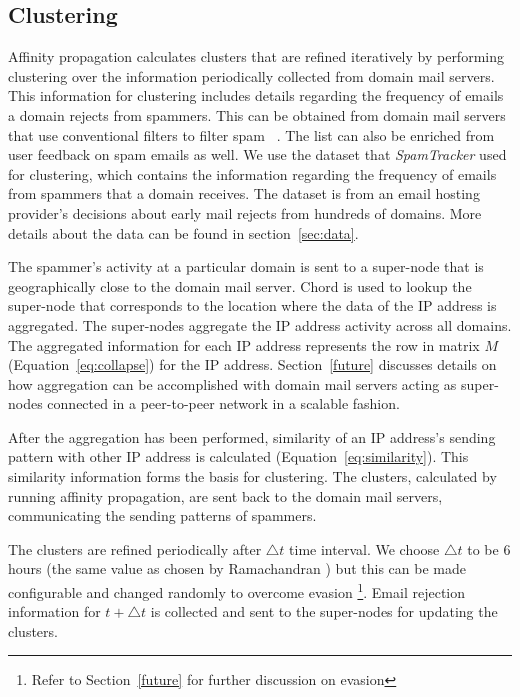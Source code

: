 \subsection{Clustering}
\label{arch-cluster}

Affinity propagation calculates clusters that are refined iteratively by performing clustering over the information periodically collected from domain mail servers. This information for clustering includes details regarding the frequency of emails a domain rejects from spammers. This can be obtained from domain mail servers that use conventional filters to filter spam~\cite{spamassassin} . The list can also be enriched from user feedback on spam emails as well. We use the dataset that \emph{SpamTracker} \cite{bb} used for clustering, which contains the information regarding the frequency of emails from spammers that a domain receives. The dataset is from an email hosting provider's decisions about early mail rejects from hundreds of domains. More details about the data can be found in section~\ref{sec:data}. 

The spammer's activity at a particular domain is sent to a super-node that is geographically close to the domain mail server. Chord is used to lookup the super-node that corresponds to the location where the data of the IP address is aggregated. The super-nodes aggregate the IP address activity across all domains. The aggregated information for each IP address represents the row in matrix $M$ (Equation~\ref{eq:collapse}) for the IP address.  Section~\ref{future} discusses details on how aggregation can be accomplished with domain mail servers acting as super-nodes connected in a peer-to-peer network in a scalable fashion. 

After the aggregation has been performed, similarity of an IP address's sending pattern with other IP address is calculated (Equation~\ref{eq:similarity}). This similarity information forms the basis for clustering. The clusters, calculated by running affinity propagation, are sent back to the domain mail servers, communicating the sending patterns of spammers.

The clusters are refined periodically after \emph{$\bigtriangleup t$} time interval. We choose \emph{$\bigtriangleup t$} to be 6 hours (the same value as chosen by Ramachandran \cite{bb}) but this can be made configurable and changed randomly to overcome evasion \footnote{Refer to Section~\ref{future} for further discussion on evasion}. Email rejection information for \emph{$t+\bigtriangleup t$} is collected and sent to the super-nodes for updating the clusters.
